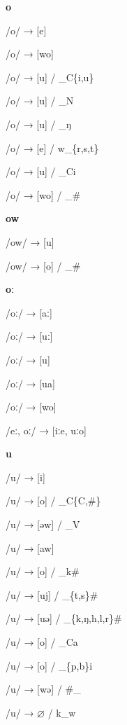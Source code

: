 \begin{center}\textbf{o}\end{center}
\begin{multicols}{4}
\noindent /o/ → [e]

\noindent /o/ → [wo]

\noindent /o/ → [u] / \_C\{i,u\}

\noindent /o/ → [u] / \_N

\noindent /o/ → [u] / \_ŋ

\noindent /o/ → [e] / w\_\{r,s,t\}

\noindent /o/ → [u] / \_Ci

\noindent /o/ → [wo] / \_\#

\end{multicols}

\begin{center}\textbf{ow}\end{center}
\begin{multicols}{4}
\noindent /ow/ → [u]

\noindent /ow/ → [o] / \_\#
\end{multicols}

\begin{center}\textbf{oː}\end{center}
\begin{multicols}{4}
\noindent /oː/ → [aː]

\noindent /oː/ → [uː]

\noindent /oː/ → [u]

\noindent /oː/ → [ua]

\noindent /oː/ → [wo]

\noindent /eː, oː/ → [iːe, uːo]
\end{multicols}

\begin{center}\textbf{u}\end{center}
\begin{multicols}{4}
\noindent /u/ → [i]

\noindent /u/ → [o] / \_C\{C,\#\}

\noindent /u/ → [əw] / \_V

\noindent /u/ → [aw]

\noindent /u/ → [o] / \_k\#

\noindent /u/ → [uj] / \_\{t,s\}\#

\noindent /u/ → [uə] / \_\{k,ŋ,h,l,r\}\#

\noindent /u/ → [o] / \_Ca

\noindent /u/ → [o] / \_\{p,b\}i

\noindent /u/ → [wə] / \#\_

\noindent /u/ → $\varnothing$ / k\_w
\end{multicols}

